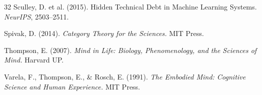 \documentclass[11pt,a4paper]{article}
\begin{document}
\begin{thebibliography}{32}
Sculley, D. et al. (2015).
Hidden Technical Debt in Machine Learning Systems.
\textit{NeurIPS}, 2503--2511.

Spivak, D. (2014).
\textit{Category Theory for the Sciences.}
MIT Press.

Thompson, E. (2007).
\textit{Mind in Life: Biology, Phenomenology, and the Sciences of Mind.}
Harvard UP.

Varela, F., Thompson, E., \& Rosch, E. (1991).
\textit{The Embodied Mind: Cognitive Science and Human Experience.}
MIT Press.

\end{thebibliography}
\end{document}

